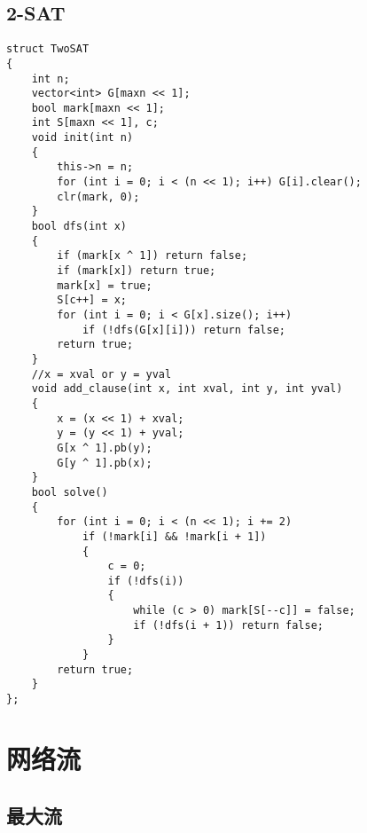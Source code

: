 \documentclass[a4]{article}
\begin{document}
\subsection{2-SAT}
\begin{lstlisting}
struct TwoSAT
{
    int n;
    vector<int> G[maxn << 1];
    bool mark[maxn << 1];
    int S[maxn << 1], c;
    void init(int n)
    {
        this->n = n;
        for (int i = 0; i < (n << 1); i++) G[i].clear();
        clr(mark, 0);
    }
    bool dfs(int x)
    {
        if (mark[x ^ 1]) return false;
        if (mark[x]) return true;
        mark[x] = true;
        S[c++] = x;
        for (int i = 0; i < G[x].size(); i++)
            if (!dfs(G[x][i])) return false;
        return true;
    }
    //x = xval or y = yval
    void add_clause(int x, int xval, int y, int yval)
    {
        x = (x << 1) + xval;
        y = (y << 1) + yval;
        G[x ^ 1].pb(y);
        G[y ^ 1].pb(x);
    }
    bool solve()
    {
        for (int i = 0; i < (n << 1); i += 2)
            if (!mark[i] && !mark[i + 1])
            {
                c = 0;
                if (!dfs(i))
                {
                    while (c > 0) mark[S[--c]] = false;
                    if (!dfs(i + 1)) return false;
                }
            }
        return true;
    }
};
\end{lstlisting}
\clearpage\section{网络流}
\subsection{最大流}
\end{document}
